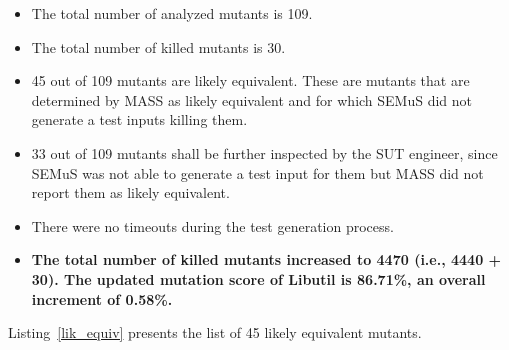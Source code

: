 \begin{itemize}
	\item The total number of analyzed mutants is 109.
	\item The total number of killed mutants is 30.
	\item 45 out of 109 mutants are likely equivalent. These are mutants that are determined by MASS as likely equivalent and for which SEMuS did not generate a test inputs killing them.
	\item 33 out of 109 mutants shall be further inspected by the SUT engineer, since SEMuS was not able to generate a test input for them but MASS did not report them as likely equivalent.
	\item There were no timeouts during the test generation process.
	\item \textbf{The total number of killed mutants increased to 4470 (i.e., 4440 + 30). The updated mutation score of Libutil is 86.71\%, an overall increment of 0.58\%.}
\end{itemize}


Listing~\ref{lik_equiv} presents the list of 45 likely equivalent mutants.

